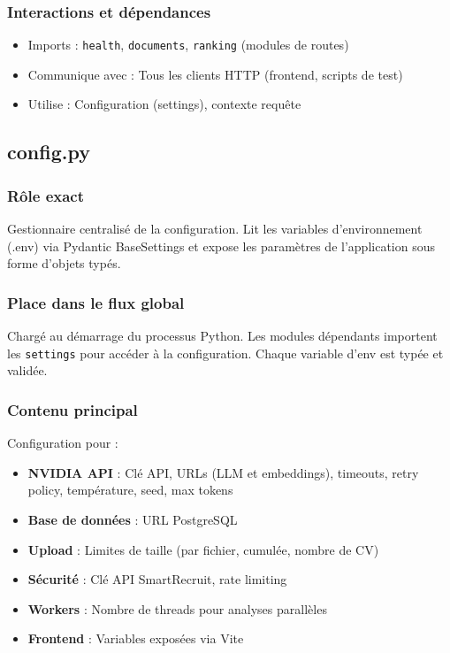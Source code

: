 \documentclass[12pt,a4paper,oneside]{book}
\begin{document}
\subsubsection{Interactions et dépendances}

\begin{itemize}
    \item Imports : \texttt{health}, \texttt{documents}, \texttt{ranking} (modules de routes)
    \item Communique avec : Tous les clients HTTP (frontend, scripts de test)
    \item Utilise : Configuration (settings), contexte requête
\end{itemize}

\subsection{config.py}

\subsubsection{Rôle exact}

Gestionnaire centralisé de la configuration. Lit les variables d'environnement (.env) via Pydantic BaseSettings et expose les paramètres de l'application sous forme d'objets typés.

\subsubsection{Place dans le flux global}

Chargé au démarrage du processus Python. Les modules dépendants importent les \texttt{settings} pour accéder à la configuration. Chaque variable d'env est typée et validée.

\subsubsection{Contenu principal}

Configuration pour :
\begin{itemize}
    \item \textbf{NVIDIA API} : Clé API, URLs (LLM et embeddings), timeouts, retry policy, température, seed, max tokens
    \item \textbf{Base de données} : URL PostgreSQL
    \item \textbf{Upload} : Limites de taille (par fichier, cumulée, nombre de CV)
    \item \textbf{Sécurité} : Clé API SmartRecruit, rate limiting
    \item \textbf{Workers} : Nombre de threads pour analyses parallèles
    \item \textbf{Frontend} : Variables exposées via Vite
\end{itemize}
\end{document}
